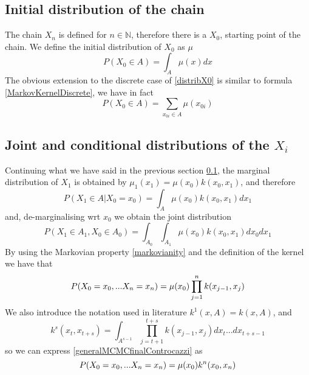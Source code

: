 \documentclass[12pt,mythesisstyle]{report}
\begin{document}
\subsection{Initial distribution of the chain}\label{subsectionX0distrib}
The chain $X_n$ is defined for $n \in \mathbb{N}$, therefore there is a $X_0$, starting point of the chain. We define the initial distribution of $X_0$ as $\mu$
\begin{equation}\label{distribX0}
P(X_0 \in A)=\int_A \mu(x) dx
\end{equation}
The obvious extension to the discrete case of \eqref{distribX0} is similar to formula \eqref{MarkovKernelDiscrete}, we have in fact
\begin{equation}\label{distribX0discrete}
P(X_0 \in A)=\sum_{x_{0i} \in A } \mu(x_{0i}) 
\end{equation}


\subsection{Joint and conditional distributions of the $X_i$}
Continuing what we have said in the previous section \ref{subsectionX0distrib}, the marginal distribution of $X_1$ is obtained by  $\mu_1(x_1)=\mu(x_0)k(x_0,x_1)$, and therefore \cite{RobertCasella} 
\begin{equation}
P(X_1 \in A|X_0=x_0)=\int_A \mu(x_0)k(x_0,x_1) dx_1
\end{equation}
and, de-marginalising wrt $x_0$ we obtain the joint distribution
\begin{equation}
P(X_1 \in A_1, X_0 \in A_0)=\int_{A_0} \int_{A_1} \mu(x_0)k(x_0,x_1) dx_0dx_1
\end{equation}
By using the Markovian property \eqref{markovianity} and the definition of the kernel we have that \cite{mcmcnotes}
\begin{equation}\label{generalMCMCfinalControcazzi} 
P(X_0=x_0,...X_n=x_n)= \\
\mu(x_0)\prod_{j=1}^{n}k(x_{j-1},x_j)
\end{equation}
We also introduce the notation used in literature \cite{RobertCasella} \cite{mcmcnotes} $k^1(x,A)=k(x,A)$, and
\begin{equation}\label{kernelN}
k^s(x_t,x_{t+s})=\int_{A^{s-1}} \prod_{j=t+1}^{t+s} k(x_{j-1},x_j)dx_t...dx_{t+s-1}
\end{equation}
so we can express \eqref{generalMCMCfinalControcazzi} as
\begin{equation}\label{generalMCMCfinalControcazziEconkenne}
P(X_0=x_0,...X_n=x_n)= \\
\mu(x_0)k^n(x_{0},x_n)
\end{equation}
\end{document}
